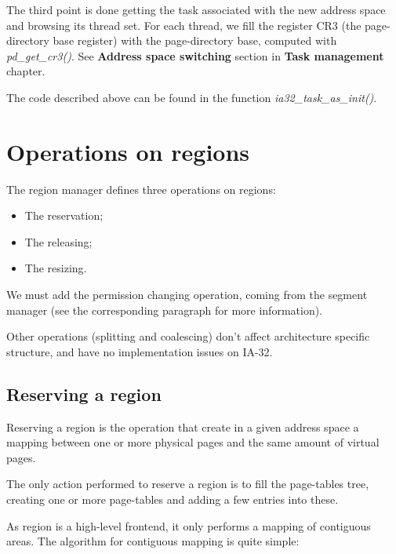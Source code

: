 The third point is done getting the task associated with the new
address space and browsing its thread set. For each thread, we fill
the register CR3 (the page-directory base register) with the
page-directory base, computed with \textit{pd\_get\_cr3()}. See
\textbf{Address space switching} section in \textbf{Task management}
chapter.

The code described above can be found in the function
\textit{ia32\_task\_as\_init()}.

%
%

\section{Operations on regions}

The region manager defines three operations on regions:

\begin{itemize}
\item
  The reservation;
\item
  The releasing;
\item
  The resizing.
\end{itemize}

We must add the permission changing operation, coming from the segment
manager (see the corresponding paragraph for more information).

Other operations (splitting and coalescing) don't affect architecture
specific structure, and have no implementation issues on IA-32.

%
%

\subsection{Reserving a region}

Reserving a region is the operation that create in a given address
space a mapping between one or more physical pages and the same amount
of virtual pages.

The only action performed to reserve a region is to fill the
page-tables tree, creating one or more page-tables and adding a few
entries into these.

As region is a high-level frontend, it only performs a mapping of
contiguous areas. The algorithm for contiguous mapping is quite simple:


